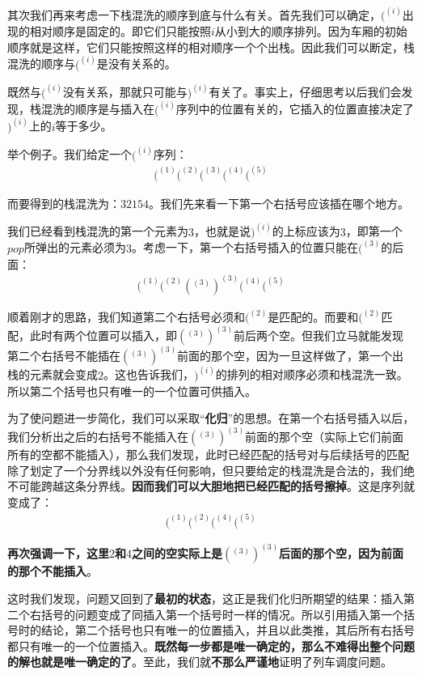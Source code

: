 \documentclass[UTF8]{ctexart}
\begin{document}
	\indent 其次我们再来考虑一下栈混洗的顺序到底与什么有关。首先我们可以确定，$(^{(i)}$出现的相对顺序是固定的。即它们只能按照$i$从小到大的顺序排列。因为车厢的初始顺序就是这样，它们只能按照这样的相对顺序一个个出栈。因此我们可以断定，栈混洗的顺序与$(^{(i)}$是没有关系的。
	
	\indent 既然与$(^{(i)}$没有关系，那就只可能与$)^{(i)}$有关了。事实上，仔细思考以后我们会发现，栈混洗的顺序是与插入在$(^{(i)}$序列中的位置有关的，它插入的位置直接决定了$)^{(i)}$上的$i$等于多少。
	
 	\indent 举个例子。我们给定一个$(^{(i)}$序列：
 	\begin{align}
 	(^{(1)}(^{(2)}(^{(3)}(^{(4)}(^{(5)}
 	\end{align}

	\indent 而要得到的栈混洗为：$32154$。我们先来看一下第一个右括号应该插在哪个地方。
	
	\indent 我们已经看到栈混洗的第一个元素为$3$，也就是说$)^{(i)}$的上标应该为$3$，即第一个$pop$所弹出的元素必须为$3$。考虑一下，第一个右括号插入的位置只能在$(^{(3)}$的后面：
	\begin{align}
 	(^{(1)}(^{(2)}(^{(3)})^{(3)}(^{(4)}(^{(5)}
 	\end{align}

	\indent 顺着刚才的思路，我们知道第二个右括号必须和$(^{(2)}$是匹配的。而要和$(^{(2)}$匹配，此时有两个位置可以插入，即$(^{(3)})^{(3)}$前后两个空。但我们立马就能发现第二个右括号不能插在$(^{(3)})^{(3)}$前面的那个空，因为一旦这样做了，第一个出栈的元素就会变成$2$。这也告诉我们，$)^{(i)}$的排列的相对顺序必须和栈混洗一致。所以第二个括号也只有唯一的一个位置可供插入。
	
	\indent 为了使问题进一步简化，我们可以采取“\textbf{化归}”的思想。在第一个右括号插入以后，我们分析出之后的右括号不能插入在$(^{(3)})^{(3)}$前面的那个空（实际上它们前面所有的空都不能插入），那么我们发现，此时已经匹配的括号对与后续括号的匹配除了划定了一个分界线以外没有任何影响，\textcolor[rgb]{0.8,0.1,0.1}{但只要给定的栈混洗是合法的，我们绝不可能跨越这条分界线}。\textbf{因而我们可以大胆地把已经匹配的括号擦掉}。这是序列就变成了：
	\begin{align}
 	(^{(1)}(^{(2)}(^{(4)}(^{(5)}
 	\end{align}
 	
 	\indent \textbf{再次强调一下，这里$2$和$4$之间的空实际上是$(^{(3)})^{(3)}$后面的那个空，因为前面的那个不能插入}。
 	
 	\indent 这时我们发现，问题又回到了\textbf{最初的状态}，这正是我们化归所期望的结果：插入第二个右括号的问题变成了同插入第一个括号时一样的情况。所以引用插入第一个括号时的结论，第二个括号也只有唯一的位置插入，并且以此类推，其后所有右括号都只有唯一的一个位置插入。\textbf{既然每一步都是唯一确定的，那么不难得出整个问题的解也就是唯一确定的了}。至此，我们就\textbf{不那么严谨地}证明了列车调度问题。
 	
\end{document}
